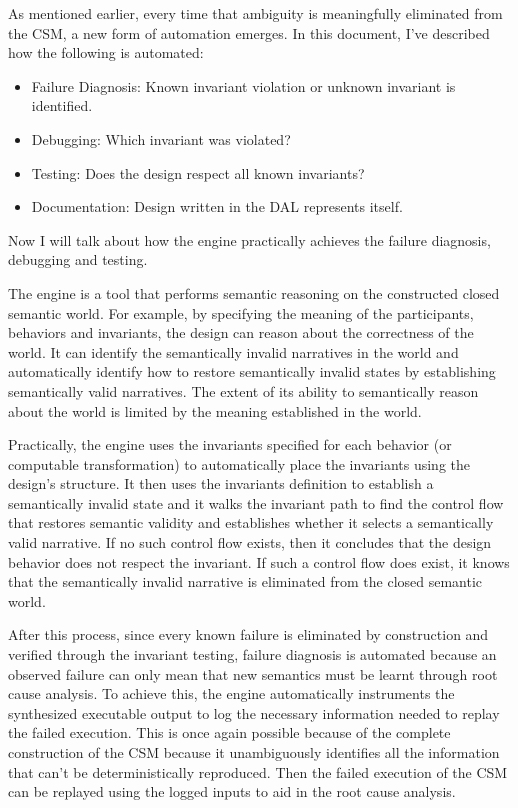 \documentclass{article}
\begin{document}
As mentioned earlier, every time that ambiguity is meaningfully eliminated from the CSM, a new form of automation emerges. In this document, I've described how the following is automated:

\begin{itemize}
    \item Failure Diagnosis: Known invariant violation or unknown invariant is identified.
    \item Debugging: Which invariant was violated?
    \item Testing: Does the design respect all known invariants?
    \item Documentation: Design written in the DAL represents itself.
\end{itemize}

Now I will talk about how the engine practically achieves the failure diagnosis, debugging and testing.

The engine is a tool that performs semantic reasoning on the constructed closed semantic world. For example, by specifying the meaning of the participants, behaviors and invariants, the design can reason about the correctness of the world. It can identify the semantically invalid narratives in the world and automatically identify how to restore semantically invalid states by establishing semantically valid narratives. The extent of its ability to semantically reason about the world is limited by the meaning established in the world.

Practically, the engine uses the invariants specified for each behavior (or computable transformation) to automatically place the invariants using the design's structure. It then uses the invariants definition to establish a semantically invalid state and it walks the invariant path to find the control flow that restores semantic validity and establishes whether it selects a semantically valid narrative. If no such control flow exists, then it concludes that the design behavior does not respect the invariant. If such a control flow does exist, it knows that the semantically invalid narrative is eliminated from the closed semantic world.

After this process, since every known failure is eliminated by construction and verified through the invariant testing, failure diagnosis is automated because an observed failure can only mean that new semantics must be learnt through root cause analysis. To achieve this, the engine automatically instruments the synthesized executable output to log the necessary information needed to replay the failed execution. This is once again possible because of the complete construction of the CSM because it unambiguously identifies all the information that can't be
deterministically reproduced. Then the failed execution of the CSM can be replayed using the logged inputs to aid in the root cause analysis.
\end{document}
